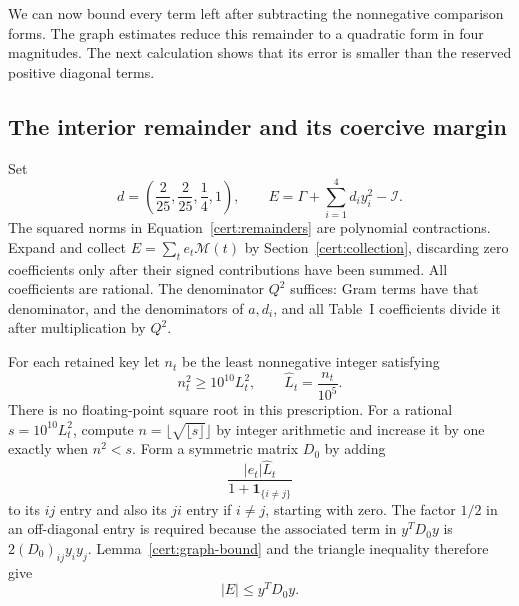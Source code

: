 We can now bound every term left after subtracting the nonnegative
comparison forms. The graph estimates reduce this remainder to a
quadratic form in four magnitudes. The next calculation shows that
its error is smaller than the reserved positive diagonal terms.

\subsection{The interior remainder and its coercive margin}\label{cert:interior-remainder}

Set
\begin{equation}\label{cert:remainders}
 d=\left(\frac2{25},\frac2{25},\frac14,1\right),\qquad
 E=\Gamma+\sum_{i=1}^4d_i y_i^2-\mathcal I.
\end{equation}
The squared norms in Equation~\eqref{cert:remainders} are polynomial
contractions.  Expand
and collect $E=\sum_t e_t\mathcal M(t)$ by Section~\ref{cert:collection},
discarding zero coefficients only after their signed contributions have
been summed.  All coefficients are rational.  The denominator $Q^2$
suffices: Gram terms have that denominator, and the denominators of
$a,d_i$, and all Table~I coefficients divide it after multiplication by
$Q^2$.

For each retained key let $n_t$ be the least nonnegative integer satisfying
\begin{equation}\label{cert:root-rounding}
 n_t^2\ge10^{10}L_t^2,
 \qquad \widehat L_t=\frac{n_t}{10^5}.
\end{equation}
There is no floating-point square root in this prescription.  For a rational
$s=10^{10}L_t^2$, compute $n=\lfloor\sqrt{\lfloor s\rfloor}\rfloor$ by
integer arithmetic and increase it by one exactly when $n^2<s$.
Form a symmetric matrix $D_0$ by adding
\begin{equation}\label{cert:D0}
 \frac{|e_t|\widehat L_t}{1+\mathbf1_{\{i\ne j\}}}
\end{equation}
to its $ij$ entry and also its $ji$ entry if $i\ne j$, starting with zero.
The factor $1/2$ in an off-diagonal entry is required because the associated
term in $y^TD_0y$ is $2(D_0)_{ij}y_iy_j$.  Lemma~\ref{cert:graph-bound}
and the triangle inequality therefore give
\begin{equation}\label{cert:error-bound}
 |E|\le y^TD_0y.
\end{equation}

